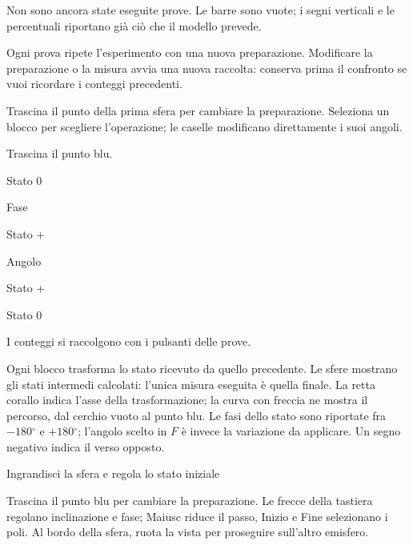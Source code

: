 Non sono ancora state eseguite prove. Le barre sono vuote; i segni verticali e le percentuali riportano già ciò che il modello prevede.\par

Ogni prova ripete l'esperimento con una nuova preparazione. Modificare la preparazione o la misura avvia una nuova raccolta: conserva prima il confronto se vuoi ricordare i conteggi precedenti.\par


Trascina il punto della prima sfera per cambiare la preparazione. Seleziona un blocco per scegliere l'operazione; le caselle modificano direttamente i suoi angoli.\par

Trascina il punto blu.\par

Stato 0\par

Fase\par

Stato +\par

Angolo\par

Stato +\par

Stato 0\par

I conteggi si raccolgono con i pulsanti delle prove.\par

Ogni blocco trasforma lo stato ricevuto da quello precedente. Le sfere mostrano gli stati intermedi calcolati: l'unica misura eseguita è quella finale. La retta corallo indica l'asse della trasformazione; la curva con freccia ne mostra il percorso, dal cerchio vuoto al punto blu. Le fasi dello stato sono riportate fra \(- 180{}^{\circ} \) e \(+180{}^{\circ} \); l'angolo scelto in \(F\) è invece la variazione da applicare. Un segno negativo indica il verso opposto.\par

Ingrandisci la sfera e regola lo stato iniziale\par

Trascina il punto blu per cambiare la preparazione. Le frecce della tastiera regolano inclinazione e fase; Maiusc riduce il passo, Inizio e Fine selezionano i poli. Al bordo della sfera, ruota la vista per proseguire sull'altro emisfero.\par

